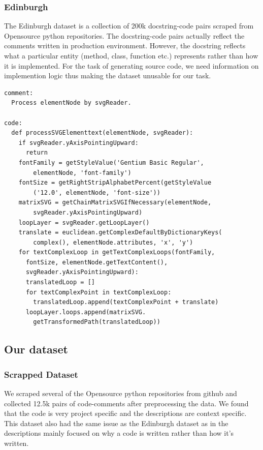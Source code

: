 \documentclass{IEEEtran}
\begin{document}
        \subsubsection{Edinburgh}
        The Edinburgh dataset is a collection of 200k docstring-code pairs scraped
        from Opensource python repositories. The docstring-code pairs actually
        reflect the comments written in production environment. However, the docstring
        reflects what a particular entity (method, class, function etc.) represents
        rather than how it is implemented. For the task of generating source code,
        we need information on implemention logic thus making the dataset unusable
        for our task.

        \begin{lstlisting}[frame=single,basicstyle=\scriptsize]
comment:
  Process elementNode by svgReader.

code:
  def processSVGElementtext(elementNode, svgReader):
    if svgReader.yAxisPointingUpward:
      return
    fontFamily = getStyleValue('Gentium Basic Regular', 
        elementNode, 'font-family')
    fontSize = getRightStripAlphabetPercent(getStyleValue
        ('12.0', elementNode, 'font-size'))
    matrixSVG = getChainMatrixSVGIfNecessary(elementNode, 
        svgReader.yAxisPointingUpward)
    loopLayer = svgReader.getLoopLayer()
    translate = euclidean.getComplexDefaultByDictionaryKeys(
        complex(), elementNode.attributes, 'x', 'y')
    for textComplexLoop in getTextComplexLoops(fontFamily, 
      fontSize, elementNode.getTextContent(), 
      svgReader.yAxisPointingUpward):
      translatedLoop = []
      for textComplexPoint in textComplexLoop:
        translatedLoop.append(textComplexPoint + translate)
      loopLayer.loops.append(matrixSVG.
        getTransformedPath(translatedLoop))
        \end{lstlisting}

      \subsection{Our dataset}
        \subsubsection{Scrapped Dataset}
        We scraped several of the Opensource python repositories from github and
        collected 12.5k pairs of code-comments after preprocessing the data.
        We found that the code is very project specific and the descriptions are context specific.
        This dataset also had the same issue as the Edinburgh dataset as in the descriptions
        mainly focused on why a code is written rather than how it's written.
\end{document}
